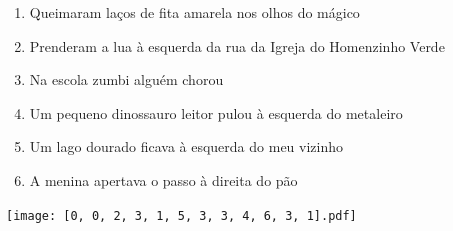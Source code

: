 \documentclass[12pt]{article}
\begin{document}
		 

\pagebreak


	\begin{enumerate}
		  \sffamily %
		  \large %


\vfill \item
Queimaram laços de fita amarela	%
nos olhos do mágico	%

\vfill \item
Prenderam a lua	%
à esquerda
da rua da Igreja do Homenzinho Verde	%

\vfill \item
Na escola zumbi	%
alguém chorou	%

\vfill \item
Um pequeno dinossauro leitor pulou	%
à esquerda
do metaleiro	%

\vfill \item
Um lago dourado ficava	%
à esquerda
do meu vizinho	%

\vfill \item
A menina apertava o passo	%
à direita
do pão	%
	\end{enumerate}
		  
		  \hfill

		  \vfill

\texttt{[image: [0, 0, 2, 3, 1, 5, 3, 3, 4, 6, 3, 1].pdf]}


	\hfill	  	  


\pagebreak			
\end{document}
